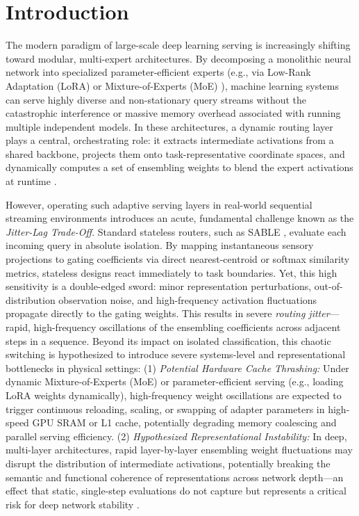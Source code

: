 \section{Introduction}
\label{sec:intro}

The modern paradigm of large-scale deep learning serving is increasingly shifting toward modular, multi-expert architectures. By decomposing a monolithic neural network into specialized parameter-efficient experts (e.g., via Low-Rank Adaptation (LoRA) \cite{hu2021lora} or Mixture-of-Experts (MoE) \cite{shazeer2017outrageously, fedus2022switch}), machine learning systems can serve highly diverse and non-stationary query streams without the catastrophic interference or massive memory overhead associated with running multiple independent models. In these architectures, a dynamic routing layer plays a central, orchestrating role: it extracts intermediate activations from a shared backbone, projects them onto task-representative coordinate spaces, and dynamically computes a set of ensembling weights to blend the expert activations at runtime \cite{wortsman2022model, ilharco2022editing}.

However, operating such adaptive serving layers in real-world sequential streaming environments introduces an acute, fundamental challenge known as the \emph{Jitter-Lag Trade-Off}. Standard stateless routers, such as SABLE \cite{sable2024}, evaluate each incoming query in absolute isolation. By mapping instantaneous sensory projections to gating coefficients via direct nearest-centroid or softmax similarity metrics, stateless designs react immediately to task boundaries. Yet, this high sensitivity is a double-edged sword: minor representation perturbations, out-of-distribution observation noise, and high-frequency activation fluctuations propagate directly to the gating weights. This results in severe \emph{routing jitter}---rapid, high-frequency oscillations of the ensembling coefficients across adjacent steps in a sequence. Beyond its impact on isolated classification, this chaotic switching is hypothesized to introduce severe systems-level and representational bottlenecks in physical settings: (1) \emph{Potential Hardware Cache Thrashing:} Under dynamic Mixture-of-Experts (MoE) or parameter-efficient serving (e.g., loading LoRA weights dynamically), high-frequency weight oscillations are expected to trigger continuous reloading, scaling, or swapping of adapter parameters in high-speed GPU SRAM or L1 cache, potentially degrading memory coalescing and parallel serving efficiency. (2) \emph{Hypothesized Representational Instability:} In deep, multi-layer architectures, rapid layer-by-layer ensembling weight fluctuations may disrupt the distribution of intermediate activations, potentially breaking the semantic and functional coherence of representations across network depth---an effect that static, single-step evaluations do not capture but represents a critical risk for deep network stability \cite{packinetics2025}.

